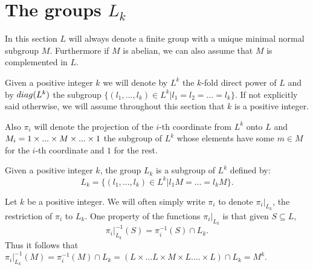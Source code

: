 \chapter{The groups \texorpdfstring{$L_k$}{Lk}} \label{TheGroupsLk}

In this section $L$ will always denote a finite group with a unique minimal normal subgroup $M$. Furthermore if $M$ is abelian, we can also assume that $M$ is complemented in $L$.

Given a positive integer $k$ we will denote by $L^{k}$ the $k$-fold direct power of $L$ and by $diag({L^{k}})$ the subgroup $\{(l_1,...,l_k) \in L^k | l_1 = l_2 = ... = l_k\}$. If not explicitly said otherwise, we will assume throughout this section that $k$ is a positive integer.

Also $\pi_i$ will denote the projection of the $i$-th coordinate from $L^k$ onto $L$ and $M_{i} = 1\times ... \times M \times ... \times 1$ the subgroup of $L^k$ whose elements have some $m \in M$ for the $i$-th coordinate and $1$ for the rest.

\begin{definition}
    Given a positive integer $k$, the group $L_k$ is a subgroup of $L^{k}$ defined by:
    $$
    L_k = \{ (l_1,...,l_k) \in L^k | l_1M = ... = l_kM \}.
    $$
\end{definition}

Let $k$ be a positive integer.
We will often simply write $\pi_i$ to denote $\pi_i|_{L_k}$, the restriction of $\pi_i$ to $L_k$. One property of the functions $\pi_i|_{L_k}$ is that given $S \subseteq L$,
$$
\pi_i|_{L_k}^{-1}(S) = \pi_i^{-1}(S) \cap L_k.
$$
Thus it follows that $\pi_i|_{L_k}^{-1}(M) = \pi_i^{-1}(M) \cap L_k = (L \times ... L \times M \times L .... \times L) \cap L_k = M^k$.






